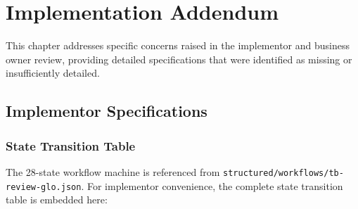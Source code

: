 \chapter{Implementation Addendum}
\label{ch:implementation-addendum}

This chapter addresses specific concerns raised in the implementor and 
business owner review, providing detailed specifications that were identified 
as missing or insufficiently detailed.

\section{Implementor Specifications}
\label{sec:implementor-specs}

\subsection{State Transition Table}
\label{sec:state-transitions}

The 28-state workflow machine is referenced from 
\texttt{structured/workflows/tb-review-glo.json}. For implementor convenience,
the complete state transition table is embedded here:

